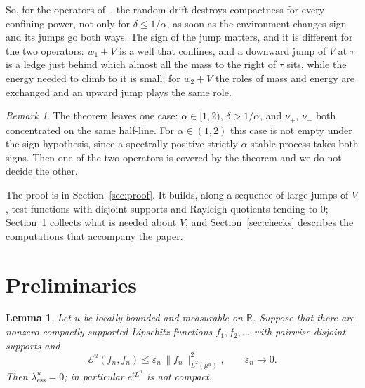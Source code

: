 \documentclass[11pt]{amsart}
\newtheorem{lemma}[theorem]{Lemma}
\theoremstyle{remark}
\newtheorem{remark}[theorem]{Remark}
\newcommand{\R}{\mathbb R}
\newcommand{\cE}{\mathcal E}
\newcommand{\essbot}{\lambda_{\mathrm{ess}}}
\begin{document}
So, for the operators of~\cite[Remark~5.3(ii)]{SW}, the random drift destroys compactness for every confining power, not only for $\delta\le1/\alpha$, as soon as the environment changes sign and its jumps go both ways. The sign of the jump matters, and it is different for the two operators: $w_1+V$ is a well that confines, and a downward jump of $V$ at $\tau$ is a ledge just behind which almost all the mass to the right of $\tau$ sits, while the energy needed to climb to it is small; for $w_2+V$ the roles of mass and energy are exchanged and an upward jump plays the same role.

\begin{remark}\label{rem:open}
The theorem leaves one case: $\alpha\in[1,2)$, $\delta>1/\alpha$, and $\nu_+$, $\nu_-$ both concentrated on the same half-line. For $\alpha\in(1,2)$ this case is not empty under the sign hypothesis, since a spectrally positive strictly $\alpha$-stable process takes both signs. Then one of the two operators is covered by the theorem and we do not decide the other.
\end{remark}

The proof is in Section~\ref{sec:proof}. It builds, along a sequence of large jumps of $V$, test functions with disjoint supports and Rayleigh quotients tending to $0$; Section~\ref{sec:prelim} collects what is needed about $V$, and Section~\ref{sec:checks} describes the computations that accompany the paper.

\section{Preliminaries}\label{sec:prelim}

\begin{lemma}\label{lem:minmax}
Let $u$ be locally bounded and measurable on $\R$. Suppose that there are nonzero compactly supported Lipschitz functions $f_1,f_2,\dots$ with pairwise disjoint supports and
\[
\cE^u(f_n,f_n)\le\varepsilon_n\,\|f_n\|^2_{L^2(\mu^u)},\qquad\varepsilon_n\to0 .
\]
Then $\essbot^u=0$; in particular $e^{tL^u}$ is not compact.
\end{lemma}
\end{document}
